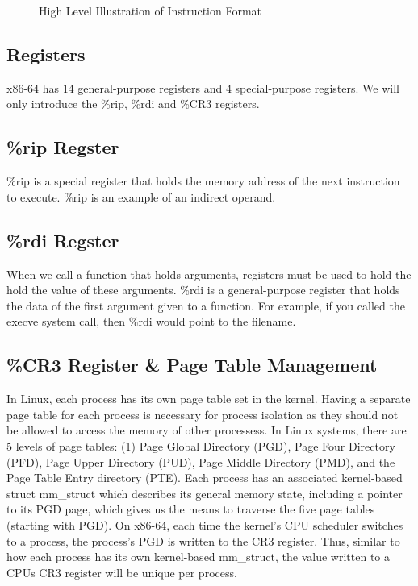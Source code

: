 \documentclass{report}
\begin{document}
\begin{spacing}{1.5}
\begin{figure}[ht]
    \centering
    \caption{High Level Illustration of Instruction Format}
\end{figure}



\subsection{Registers}

{\large
x86-64 has 14 general-purpose registers and 4 special-purpose registers. We will only introduce the \%rip, \%rdi and \%CR3 registers.
\newline
}

\subsection{\%rip Regster}

{\large
\%rip is a special register that holds the memory address of the next instruction to execute. \%rip is an example of an indirect operand.
\newline
}


\subsection{\%rdi Regster}

{\large
When we call a function that holds arguments, registers must be used to hold the hold the value of these arguments. \%rdi is a general-purpose register that holds the data of the first argument given to a function. For example, if you called the execve system call, then \%rdi would point to the filename.
\newline
}


\subsection{\%CR3 Register \& Page Table Management}

{\large
In Linux, each process has its own page table set in the kernel. Having a separate page table for each process is necessary for process isolation as they should not be allowed to access the memory of other processess. In Linux systems, there are 5 levels of page tables: (1) Page Global Directory (PGD), Page Four Directory (PFD), Page Upper Directory (PUD), Page Middle Directory (PMD), and the Page Table Entry directory (PTE). Each process has an associated kernel-based struct mm\_struct which describes its general memory state, including a pointer to its PGD page, which gives us the means to traverse the five page tables (starting with PGD). On x86-64, each time the kernel's CPU scheduler switches to a process, the process's PGD is written to the CR3 register. Thus, similar to how each process has its own kernel-based mm\_struct, the value written to a CPUs CR3 register will be unique per process.
\newline
}



\end{spacing}
\end{document}
